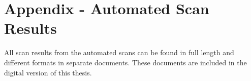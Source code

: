 \chapter{Appendix - Automated Scan Results}
\label{app:automated-scan-result}
All scan results from the automated scans can be found in full length and different formats in separate documents.
These documents are included in the digital version of this thesis.

